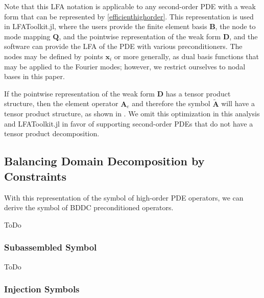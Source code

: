 \documentclass[review]{siamart190516}
\begin{document}
Note that this LFA notation is applicable to any second-order PDE with a weak form that can be represented by \cref{efficienthighorder}.
This representation is used in LFAToolkit.jl, where the users provide the finite element basis $\mathbf{B}$, the node to mode mapping $\mathbf{Q}$, and the pointwise representation of the weak form $\mathbf{D}$, and the software can provide the LFA of the PDE with various preconditioners.
The nodes may be defined by points $\mathbf x_i$ or more generally, as dual basis functions that may be applied to the Fourier modes; however, we restrict ourselves to nodal bases in this paper.

If the pointwise representation of the weak form $\mathbf{D}$ has a tensor product structure, then the element operator $\mathbf{A}_e$ and therefore the symbol $\tilde{\mathbf{A}}$ will have a tensor product structure, as shown in \cite{he2020two}.
We omit this optimization in this analysis and LFAToolkit.jl in favor of supporting second-order PDEs that do not have a tensor product decomposition.

\subsection{Balancing Domain Decomposition by Constraints}\label{sec:lfabddc}

With this representation of the symbol of high-order PDE operators, we can derive the symbol of BDDC preconditioned operators.

ToDo

\subsubsection{Subassembled Symbol}\label{sec:lfasubassembled}

ToDo

\subsubsection{Injection Symbols}\label{sec:lfainjection}
\end{document}
